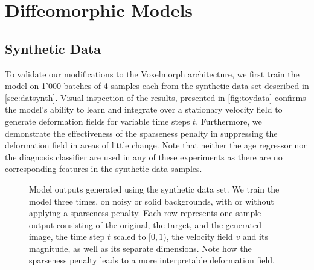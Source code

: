 \section{Diffeomorphic Models}

\subsection{Synthetic Data}
To validate our modifications to the Voxelmorph architecture, we first train the model on 1'000 batches of 4 samples each from the synthetic data set described in \autoref{sec:datsynth}. Visual inspection of the results, presented in \autoref{fig:toydata} confirms the model's ability to learn and integrate over a stationary velocity field to generate deformation fields for variable time steps $t$. Furthermore, we demonstrate the effectiveness of the sparseness penalty in suppressing the deformation field in areas of little change. Note that neither the age regressor nor the diagnosis classifier are used in any of these experiments as there are no corresponding features in the synthetic data samples. %

\begin{figure}
	\centering
	
	\vspace*{-15pt}
	\caption{Model outputs generated using the synthetic data set. We train the model three times, on noisy or solid backgrounds, with or without applying a sparseness penalty. Each row represents one sample output consisting of the original, the target, and the generated image, the time step $t$ scaled to $[0, 1)$, the velocity field $v$ and its magnitude, as well as its separate dimensions. Note how the sparseness penalty leads to a more interpretable deformation field.}
	\label{fig:toydata}
\end{figure}

